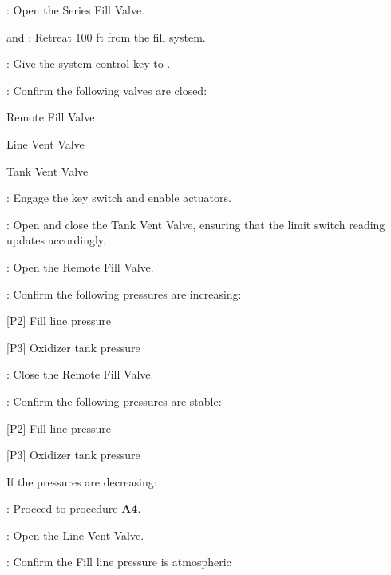 \begin{checklist}
    \item \primary: Open the Series Fill Valve.
    \item \primary{} and \secondary{}: Retreat 100 ft from the fill system.
    \item \ops{}: Give the system control key to \control{}.
    \item \control{}: Confirm the following valves are closed:
    \begin{checklist}
        \item Remote Fill Valve
        \item Line Vent Valve
        \item Tank Vent Valve
    \end{checklist}
    \item \control{}: Engage the key switch and enable actuators.
    \item \control{}: Open and close the Tank Vent Valve, ensuring that the limit switch reading updates accordingly.
    \item \control{}: Open the Remote Fill Valve.
    \item \control{}: Confirm the following pressures are increasing:
    \begin{checklist}
        \item {[P2]} Fill line pressure
        \item {[P3]} Oxidizer tank pressure
    \end{checklist}
    \item \control{}: Close the Remote Fill Valve.
    \item \control{}: Confirm the following pressures are stable:
    \begin{checklist}
        \item {[P2]} Fill line pressure
        \item {[P3]} Oxidizer tank pressure
    \end{checklist}
    \begin{checklist}[label=$\bullet$]
        \item If the pressures are decreasing:
        \begin{checklist}
            \item \ops{}: Proceed to procedure \textbf{A4}.
        \end{checklist}
    \end{checklist}
    \item \control{}: Open the Line Vent Valve.
    \item \control{}: Confirm the Fill line pressure is atmospheric

\end{checklist}
